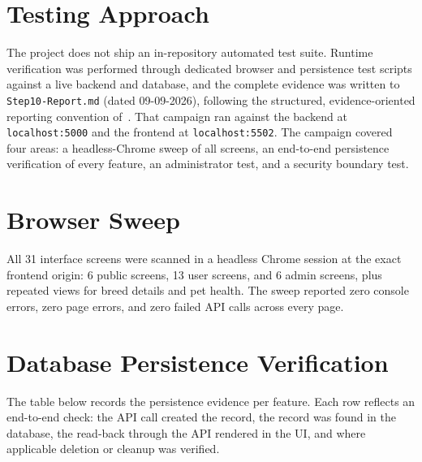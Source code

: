 
\section{Testing Approach}

The project does not ship an in-repository automated test suite. Runtime
verification was performed through dedicated browser and persistence test
scripts against a live backend and database, and the complete evidence was
written to \texttt{Step10-Report.md} (dated 09-09-2026), following the
structured, evidence-oriented reporting convention of~\cite{ieee}. That campaign ran
against the backend at \texttt{localhost:5000} and the frontend at
\texttt{localhost:5502}. The campaign covered four areas: a headless-Chrome
sweep of all screens, an end-to-end persistence verification of every feature,
an administrator test, and a security boundary test.

\section{Browser Sweep}

All 31 interface screens were scanned in a headless Chrome session at the exact
frontend origin: 6 public screens, 13 user screens, and 6 admin screens, plus
repeated views for breed details and pet health. The sweep reported zero
console errors, zero page errors, and zero failed API calls across every page.

\section{Database Persistence Verification}

The table below records the persistence evidence per feature. Each row reflects
an end-to-end check: the API call created the record, the record was found in
the database, the read-back through the API rendered in the UI, and where
applicable deletion or cleanup was verified.

